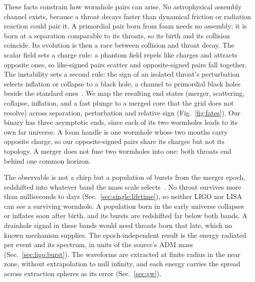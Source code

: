 \documentclass[twocolumn,floatfix,aps,prd,superscriptaddress,nofootinbib,showkeys]{revtex4-2}
\begin{document}
These facts constrain how wormhole pairs can arise. No astrophysical assembly channel exists, because a throat decays faster than dynamical friction or radiation reaction could pair it. A primordial pair born from foam needs no assembly: it is born at a separation comparable to its throats, so its birth and its collision coincide. Its evolution is then a race between collision and throat decay. The scalar field sets a charge rule: a phantom field repels like charges and attracts opposite ones, so like-signed pairs scatter and opposite-signed pairs fall together. The instability sets a second rule: the sign of an isolated throat's perturbation selects inflation or collapse to a black hole, a channel to primordial black holes beside the standard ones~\cite{zeldovich1967,carr_hawking1974,carr2021}. We map the resulting end states (merger, scattering, collapse, inflation, and a fast plunge to a merged core that the grid does not resolve) across separation, perturbation and relative sign (Fig.~\ref{fig:fates}). Our binary has three asymptotic ends, since each of its two wormholes leads to its own far universe. A foam handle is one wormhole whose two mouths carry opposite charge, so our opposite-signed pairs share its charges but not its topology. A merger does not fuse two wormholes into one: both throats end behind one common horizon.

The observable is not a chirp but a population of bursts from the merger epoch, redshifted into whatever band the mass scale selects~\cite{caprini2018,nanograv2023,lisa2017,lvk2021}. No throat survives more than milliseconds to days (Sec.~\ref{sec:single:lifetime}), so neither LIGO nor LISA~\cite{aligo2010,robson2019,thrane2013} can see a surviving wormhole. A population born in the early universe collapses or inflates soon after birth, and its bursts are redshifted far below both bands. A drainhole signal in these bands would need throats born that late, which no known mechanism supplies. The epoch-independent result is the energy radiated per event and its spectrum, in units of the source's ADM mass (Sec.~\ref{sec:ligo:burst}). The waveforms are extracted at finite radius in the near zone, without extrapolation to null infinity, and each energy carries the spread across extraction spheres as its error (Sec.~\ref{sec:gw}).
\end{document}
